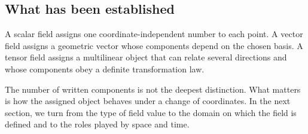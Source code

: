 \subsection{What has been established}

A scalar field assigns one coordinate-independent number to each point. A vector field assigns a geometric vector whose components depend on the chosen basis. A tensor field assigns a multilinear object that can relate several directions and whose components obey a definite transformation law.

The number of written components is not the deepest distinction. What matters is how the assigned object behaves under a change of coordinates. In the next section, we turn from the type of field value to the domain on which the field is defined and to the roles played by space and time.